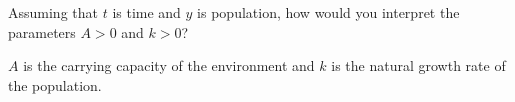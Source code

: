 Assuming that $t$ is time and $y$ is population, how would you interpret the parameters $A>0$ and $k>0$?

\begin{solution}
    $A$ is the carrying capacity of the environment and $k$ is the natural growth rate of the population.
\end{solution}